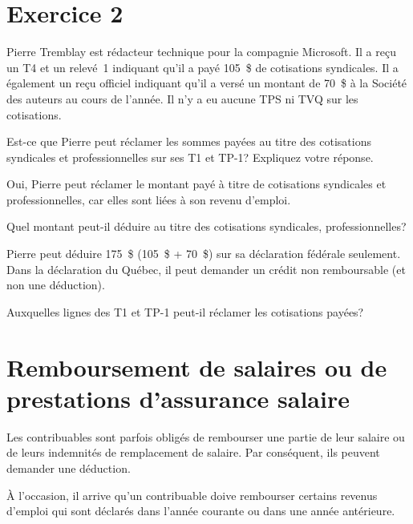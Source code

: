 


\section{Exercice 2}
\setcounter{question}{0}
\begin{question}
	Pierre Tremblay est rédacteur technique pour la compagnie Microsoft. Il a reçu un T4 et un relevé~1 indiquant qu'il a payé 105~\$ de cotisations syndicales. Il a également un reçu officiel indiquant qu'il a versé un montant de 70~\$ à la Société des auteurs au cours de l'année. Il n'y a eu aucune TPS ni TVQ sur les cotisations.
\end{question}

\setcounter{sousQuestion}{0}
\begin{sousQuestion}
	Est-ce que Pierre peut réclamer les sommes payées au titre des cotisations syndicales et professionnelles sur ses T1 et TP-1? Expliquez votre réponse.
\end{sousQuestion}
Oui, Pierre peut réclamer le montant payé à titre de cotisations syndicales et professionnelles, car elles sont liées à son revenu d'emploi.

\begin{sousQuestion}
	Quel montant peut-il déduire au titre des cotisations syndicales, professionnelles? 
\end{sousQuestion}
Pierre peut déduire 175~\$ (105~\$ + 70~\$) sur sa déclaration fédérale seulement. Dans la déclaration du Québec, il peut demander un crédit non remboursable (et non une déduction).

\begin{sousQuestion}
	Auxquelles lignes des T1 et TP-1 peut-il réclamer les cotisations payées?
\end{sousQuestion}



\section{Remboursement de salaires ou de prestations d'assurance salaire}
\begin{intro}
	Les contribuables sont parfois obligés de rembourser une partie de leur salaire ou de leurs indemnités de remplacement de salaire. Par conséquent, ils peuvent demander une déduction.
\end{intro}

À l'occasion, il arrive qu'un contribuable doive rembourser certains revenus d'emploi qui sont déclarés dans l'année courante ou dans une année antérieure. 

